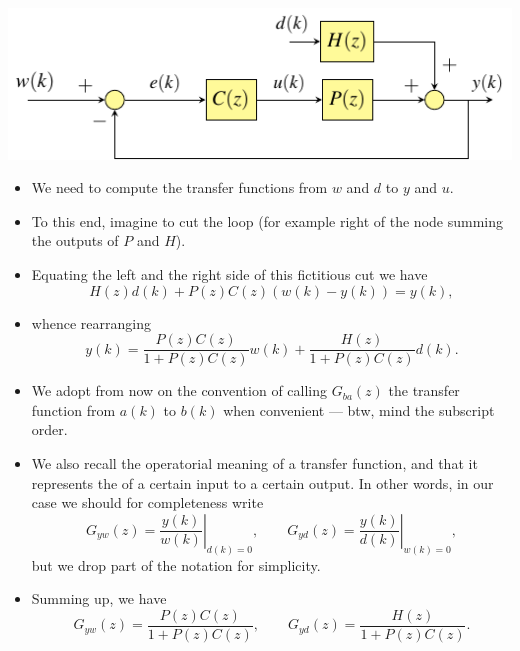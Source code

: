 \begin{frame}
 \begin{center}
  \includegraphics[width=0.40\columnwidth]{./Unit-04/img/ControlLoop.pdf}
 \end{center}\myPause
 \begin{itemize}[<+-| alert@+>]
 \item We need to compute the transfer functions from $w$ and $d$ to $y$ and $u$.
 \item To this end, imagine to cut the loop (for example right of the node summing the outputs of $P$ and $H$).
 \item Equating the left and the right side of this fictitious cut we have
       \begin{displaymath}
        H(z)d(k) + P(z)C(z) \left(w(k)-y(k) \right) = y(k),
       \end{displaymath}
 \item whence rearranging
       \begin{displaymath}
        y(k) = \frac{P(z)C(z)}{1+P(z)C(z)} w(k) + \frac{H(z)}{1+P(z)C(z)} d(k).
       \end{displaymath}
 \end{itemize}
\end{frame}

\begin{frame}
\myPause
 \begin{itemize}[<+-| alert@+>]
 \item We adopt from now on the convention of calling $G_{ba}(z)$ the transfer function from $a(k)$ to $b(k)$
       when convenient --- btw, mind the subscript order. 
 \item We also recall the operatorial meaning of a transfer function, and that it represents the 
       of a certain input to a certain output. In other words, in our case we should for completeness write
       \begin{displaymath}
        G_{yw}(z) = \left. \frac{y(k)}{w(k)} \right|_{d(k)=0}, \qquad
        G_{yd}(z) = \left. \frac{y(k)}{d(k)} \right|_{w(k)=0},
       \end{displaymath}
       but we drop part of the notation for simplicity.
 \item Summing up, we have
       \begin{displaymath}
        G_{yw}(z) = \frac{P(z)C(z)}{1+P(z)C(z)}, \qquad
        G_{yd}(z) = \frac{H(z)}{1+P(z)C(z)}.
       \end{displaymath}
 \end{itemize}
\end{frame}

